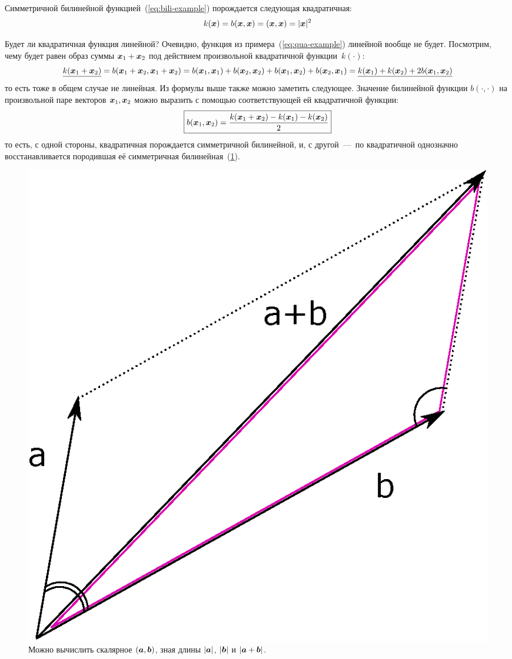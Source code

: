 \documentclass[a4paper,12pt]{article}
\begin{document}
  \begin{example}
    Симметричной билинейной функцией~(\ref{eq:bili-example}) порождается следующая квадратичная:
    \begin{equation}\label{eq:qua-example}
      k(\boldsymbol x) = b(\boldsymbol x, \boldsymbol x) = (\boldsymbol x, \boldsymbol x) = |\boldsymbol x|^2
    \end{equation}
  \end{example}
  
  Будет ли квадратичная функция линейной?
  Очевидно, функция из примера~(\ref{eq:qua-example}) линейной вообще не будет.
  Посмотрим, чему будет равен образ суммы $\bds x_1 \hm+ \bds x_2$ под действием произвольной квадратичной функции~$k(\cdot)$:
  \[
    \underline{k(\boldsymbol x_1 + \boldsymbol x_2)}
    = b(\boldsymbol x_1 + \boldsymbol x_2, \boldsymbol x_1 + \boldsymbol x_2)
    = b(\boldsymbol x_1, \boldsymbol x_1) + b(\boldsymbol x_2, \boldsymbol x_2) + b(\boldsymbol x_1, \boldsymbol x_2) + b(\boldsymbol x_2, \boldsymbol x_1)
    = \underline{k(\boldsymbol x_1) + k(\boldsymbol x_2) + 2 b(\boldsymbol x_1, \boldsymbol x_2)}
  \]
  то есть тоже в общем случае не линейная.
  Из формулы выше также можно заметить следующее.
  Значение билинейной функции $b(\cdot, \cdot)$ на произвольной паре векторов $\boldsymbol x_1, \boldsymbol x_2$ можно выразить с помощью соответствующей ей квадратичной функции:
  \[
    \boxed{
      b(\boldsymbol x_1, \boldsymbol x_2) = \frac{k(\boldsymbol x_1 + \boldsymbol x_2) - k(\boldsymbol x_1) - k(\boldsymbol x_2)}{2}
    }
  \]
  то есть, с одной стороны, квадратичная порождается симметричной билинейной, и, с другой~---~по квадратичной однозначно восстанавливается породившая её симметричная билинейная~(\ref{fig:vector-scalar}).
  
  \begin{figure}[h!]
    \centering
  
    \includegraphics[width=0.5\columnwidth]{vector-scalar}
  
    \caption{Можно вычислить скалярное $(\boldsymbol a, \boldsymbol b)$, зная длины $|\boldsymbol a|$, $|\boldsymbol b|$ и $|\bds a \hm+ \bds b|$.}
    \label{fig:vector-scalar}
  \end{figure}
  
\end{document}
